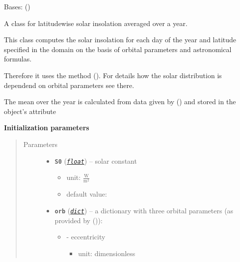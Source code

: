 \documentclass[a4paper,10pt,english]{sphinxmanual}
\begin{document}
\begin{fulllineitems}
\label{api/climlab.radiation:climlab.radiation.insolation.AnnualMeanInsolation}
Bases: {\hyperref[api/climlab.radiation:climlab.radiation.insolation._Insolation]{\emph{}}} ()

A class for latitudewise solar insolation averaged over a year.

This class computes the solar insolation for each day of the year and 
latitude specified in the domain on the basis of orbital parameters and 
astronomical formulas.

Therefore it uses the method {\hyperref[api/climlab.solar:climlab.solar.insolation.daily_insolation]{\emph{}}} ().
For details how the solar distribution is dependend on orbital parameters 
see there.

The mean over the year is calculated from data given by
{\hyperref[api/climlab.solar:climlab.solar.insolation.daily_insolation]{\emph{}}} () and stored in the 
object's attribute 

\textbf{Initialization parameters}
\begin{quote}\begin{description}
\item[{Parameters}] \leavevmode\begin{itemize}
\item {} 
\textbf{\texttt{S0}} (\href{http://docs.python.org/2.7/library/functions.html\#float}{\emph{\texttt{float}}}) -- 
solar constant
\begin{itemize}
\item {} 
unit: \(\frac{\textrm{W}}{\textrm{m}^2}\)

\item {} 
default value: 

\end{itemize}


\item {} 
\textbf{\texttt{orb}} (\href{http://docs.python.org/2.7/library/stdtypes.html\#dict}{\emph{\texttt{dict}}}) -- 
a dictionary with three orbital parameters (as provided by 
{\hyperref[api/climlab.solar:climlab.solar.orbital.OrbitalTable]{\emph{}}} ()):
\begin{itemize}
\item {} 
 - eccentricity
\begin{itemize}
\item {} 
unit: dimensionless


\end{itemize}
\end{itemize}
\end{itemize}
\end{description}
\end{quote}
\end{fulllineitems}
\end{document}
